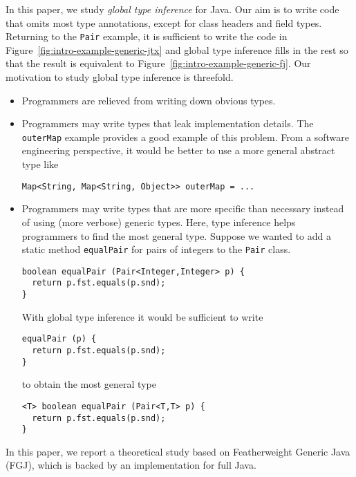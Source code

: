 In this paper, we study \emph{global type inference} for Java. Our aim
is to write code that omits most type annotations, except for class
headers and field types. Returning to the \lstinline{Pair} example, it
is sufficient to write the code in Figure~\ref{fig:intro-example-generic-jtx}
and global type inference fills in the rest so that the result is
equivalent to Figure~\ref{fig:intro-example-generic-fj}. Our
motivation to study global type inference is threefold.
\begin{itemize}
\item Programmers are relieved from writing down obvious types. 
\item Programmers may write types that leak implementation details. The
  \lstinline{outerMap} example provides a good example of this
  problem. From a software engineering
  perspective, it would be better to use a more general abstract type like
\begin{lstlisting}[basicstyle=\ttfamily\fontsize{8}{9.6}\selectfont]
Map<String, Map<String, Object>> outerMap = ...
\end{lstlisting}
\item Programmers may write types that are more specific than
  necessary instead of using (more verbose) generic types. Here, type
  inference helps programmers to find the most general type. Suppose
  we wanted to add a static  method \lstinline/equalPair/ for pairs of integers to the
  \lstinline/Pair/ class.
\begin{lstlisting}[basicstyle=\ttfamily\fontsize{8}{9.6}\selectfont]
boolean equalPair (Pair<Integer,Integer> p) {
  return p.fst.equals(p.snd);
}
\end{lstlisting}
  With global type inference it would be sufficient to write
\begin{lstlisting}
equalPair (p) {
  return p.fst.equals(p.snd);
}
\end{lstlisting}
  to obtain the most general type
\begin{lstlisting}
<T> boolean equalPair (Pair<T,T> p) {
  return p.fst.equals(p.snd);
}
\end{lstlisting}
\end{itemize}

In this paper, we report a theoretical study based on Featherweight
Generic Java \cite{DBLP:journals/toplas/IgarashiPW01} (FGJ), which is backed
by an implementation for full Java.

